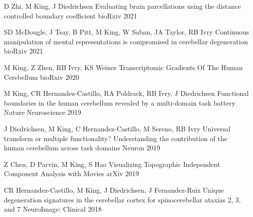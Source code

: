 

\begin{cventries}

  \cventry
    {D Zhi, M King, J Diedrichsen} %
    {Evaluating brain parcellations using the distance controlled boundary coefficient} %
    {bioRxiv} %
    {2021} %
    {}

  \cventry
    {SD McDougle, J Tsay, B Pitt, M King, W Saban, JA Taylor, RB Ivry} %
    {Continuous manipulation of mental representations is compromised in cerebellar degeneration} %
    {bioRxiv} %
    {2021} %
    {}
    
  \cventry
    {M King, Z Zhen, RB Ivry, KS Weiner} %
    {Transcriptomic Gradients Of The Human Cerebellum} %
    {bioRxiv} %
    {2020} %
    {}
    
  \cventry
    {M King, CR Hernandez-Castillo, RA Poldrack, RB Ivry, J Diedrichsen} %
    {Functional boundaries in the human cerebellum revealed by a multi-domain task battery} %
    {Nature Neuroscience} %
    {2019} %
    {}
    
  \cventry
    {J Diedrichsen, M King, C Hernandez-Castillo, M Sereno, RB Ivry} %
    {Universal transform or multiple functionality? Understanding the contribution of the human cerebellum across task domains} %
    {Neuron} %
    {2019} %
    {}
    
  \cventry
    {Z Chen, D Parvin, M King, S Hao} %
    {Visualizing Topographic Independent Component Analysis with Movies} %
    {arXiv} %
    {2019} %
    {}
    
  \cventry
    {CR Hernandez-Castillo, M King, J Diedrichsen, J Fernandez-Ruiz} %
    {Unique degeneration signatures in the cerebellar cortex for spinocerebellar ataxias 2, 3, and 7} %
    {NeuroImage: Clinical} %
    {2018} %
    {}
    

\end{cventries}
